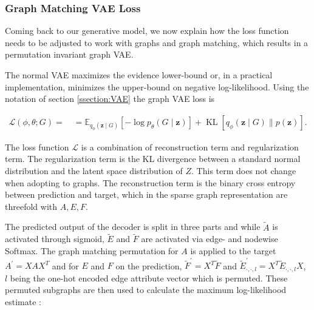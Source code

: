 {{\subsubsection{Graph Matching VAE Loss}
\label{ssec3:GVAEloss}
Coming back to our generative model, we now explain how the loss function needs to be adjusted to work with graphs and graph matching, which results in a permutation invariant graph VAE.

The normal VAE maximizes the evidence lower-bound or, in a practical implementation, minimizes the upper-bound on negative log-likelihood. Using the notation of section \ref{ssection:VAE} the graph VAE loss is

\begin{equation}
    \begin{array}{l}
    \mathcal{L}(\phi, \theta ; G)=\quad=\mathbb{E}_{q_{\phi}(\mathbf{z} \mid G)}\left[-\log p_{\theta}(G \mid \mathbf{z})\right]+\operatorname{KL}\left[q_{\phi}(\mathbf{z} \mid G) \| p(\mathbf{z})\right].
    \end{array}
\end{equation}

The loss function $\mathcal{L}$ is a combination of reconstruction term and regularization term. The regularization term is the KL divergence between a standard normal distribution and the latent space distribution of $Z$. This term does not change when adopting to graphs. The reconstruction term is the binary cross entropy between prediction and target, which in the sparse graph representation are threefold with $A, E, F$. 



The predicted output of the decoder is split in three parts and while $\tilde{A}$ is activated through sigmoid, $\tilde{E}$ and $\tilde{F}$ are activated via edge- and nodewise Softmax. The graph matching permutation for $A$ is applied to the target $A^{\prime}=X A X^{T}$ and for $E$ and $F$ on the prediction, $\widetilde{F}^{\prime}=X^{T} \widetilde{F}$ and $\widetilde{E}_{\cdot, \cdot, l}^{\prime}=X^{T} \widetilde{E}_{\cdot, \cdot, l} X$, $l$ being the one-hot encoded edge attribute vector which is permuted. These permuted subgraphs are then used to calculate the maximum log-likelihood estimate \cite{simonovsky_graphvae_2018}:

}}
